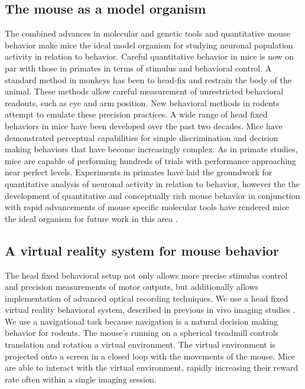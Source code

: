 \subsection{The mouse as a model organism}
The combined advances in molecular and genetic tools and quantitative mouse behavior make mice the ideal model organism for studying neuronal population activity in relation to behavior. Careful quantitative behavior in mice is now on par with those in primates in terms of stimulus and behavioral control. A standard method in monkeys has been to head-fix and restrain the body of the animal. These methods allow careful measurement of unrestricted behavioral readouts, such as eye and arm position. New behavioral methods in rodents attempt to emulate these precision practices. A wide range of head fixed behaviors in mice have been developed over the past two decades. Mice have demonstrated perceptual capabilities for simple discrimination and decision making behaviors that have become increasingly complex. As in primate studies, mice are capable of performing hundreds of trials with performance approaching near perfect levels. Experiments in primates have laid the groundwork for quantitative analysis of neuronal activity in relation to behavior, however the the development of quantitative and conceptually rich mouse behavior in conjunction with rapid advancements of mouse specific molecular tools have rendered mice the ideal organism for future work in this area \citep{OConnor2009, Andermann2010}.

\subsection{A virtual reality system for mouse behavior}
The head fixed behavioral setup not only allows more precise stimulus control and precision measurements of motor outputs, but additionally allows implementation of advanced optical recording techniques. We use a head fixed virtual reality behavioral system, described in previous in vivo imaging studies \citep{Dombeck2010, Huber2012, Harvey:2012du}. We use a navigational task because navigation is a natural decision making behavior for rodents. The mouse's running on a spherical treadmill controls translation and rotation a virtual environment. The virtual environment is projected onto a screen in a closed loop with the movements of the mouse. Mice are able to interact with the virtual environment, rapidly increasing their reward rate often within a single imaging session.

